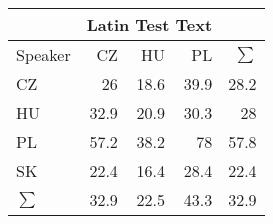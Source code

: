 \begin{tabular}{l|rrr|r}
\hline
 & \multicolumn{3}{c}{Latin Test Text} & \\
\hline
 Speaker   &   CZ &   HU &   PL &   $\sum$ \\
\hline
 CZ        & 26   & 18.6 & 39.9 &     28.2 \\
 HU        & 32.9 & 20.9 & 30.3 &     28   \\
 PL        & 57.2 & 38.2 & 78   &     57.8 \\
 SK        & 22.4 & 16.4 & 28.4 &     22.4 \\
\hline
 $\sum$   & 32.9 & 22.5 & 43.3 &     32.9 \\
\hline
\end{tabular}